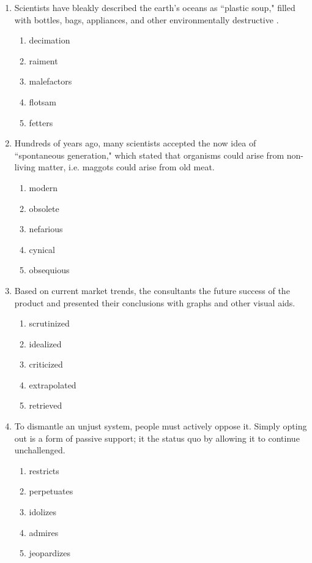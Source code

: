 \documentclass[12pt]{book}
\newcommand{\longline}{\underline{\hspace{2in}} }
\begin{document}
\begin{enumerate}
\bigskip
\item Scientists have bleakly described the earth's oceans as ``plastic soup," filled with bottles, bags, appliances, and other environmentally destructive \longline.
\begin{enumerate}[label=(\Alph*)]
\item decimation
\item raiment
\item malefactors
\item flotsam
\item fetters
\end{enumerate}

\bigskip
\item Hundreds of years ago, many scientists accepted the now \longline idea of ``spontaneous generation," which stated that organisms could arise from non-living matter, i.e. maggots could arise from old meat.

\begin{enumerate}[label=(\Alph*)]
\item modern
\item obsolete
\item nefarious
\item cynical
\item obsequious
\end{enumerate}

\bigskip
\item Based on current market trends, the consultants \longline the future success of the product and presented their conclusions with graphs and other visual aids.
\begin{enumerate}[label=(\Alph*)]
\item scrutinized
\item idealized
\item criticized
\item extrapolated
\item retrieved
\end{enumerate}

\bigskip
\item To dismantle an unjust system, people must actively oppose it.  Simply opting out is a form of passive support; it \longline the status quo by allowing it to continue unchallenged.
\begin{enumerate}[label=(\Alph*)]
\item restricts
\item perpetuates
\item idolizes
\item admires
\item jeopardizes
\end{enumerate}


\end{enumerate}
\end{document}
